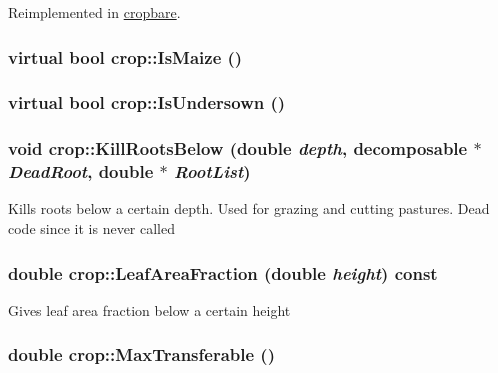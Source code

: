 Reimplemented in \hyperlink{classcropbare_a9fa5ef7d9c5e0ca6d8cc6fe35b00ab86}{cropbare}.\hypertarget{classcrop_ac831e55c0840bb1008c4d91d2c00a47a}{
\subsubsection[{IsMaize}]{\setlength{\rightskip}{0pt plus 5cm}virtual bool crop::IsMaize ()}}
\label{classcrop_ac831e55c0840bb1008c4d91d2c00a47a}
\hypertarget{classcrop_ae3212213482a95d8946090c5a481f551}{
\subsubsection[{IsUndersown}]{\setlength{\rightskip}{0pt plus 5cm}virtual bool crop::IsUndersown ()}}
\label{classcrop_ae3212213482a95d8946090c5a481f551}
\hypertarget{classcrop_a9c7ffd6332d9aa190c27618cbcaea767}{
\subsubsection[{KillRootsBelow}]{\setlength{\rightskip}{0pt plus 5cm}void crop::KillRootsBelow (double {\em depth}, \/  {\bf decomposable} $\ast$ {\em DeadRoot}, \/  double $\ast$ {\em RootList})}}
\label{classcrop_a9c7ffd6332d9aa190c27618cbcaea767}
Kills roots below a certain depth. Used for grazing and cutting pastures. Dead code since it is never called \hypertarget{classcrop_a8e4c60317adb0f14a2f21462c2eb9a6c}{
\subsubsection[{LeafAreaFraction}]{\setlength{\rightskip}{0pt plus 5cm}double crop::LeafAreaFraction (double {\em height}) const}}
\label{classcrop_a8e4c60317adb0f14a2f21462c2eb9a6c}
Gives leaf area fraction below a certain height \hypertarget{classcrop_ab0b92e4e8ee085757f97ebffb299a721}{
\subsubsection[{MaxTransferable}]{\setlength{\rightskip}{0pt plus 5cm}double crop::MaxTransferable ()}}
